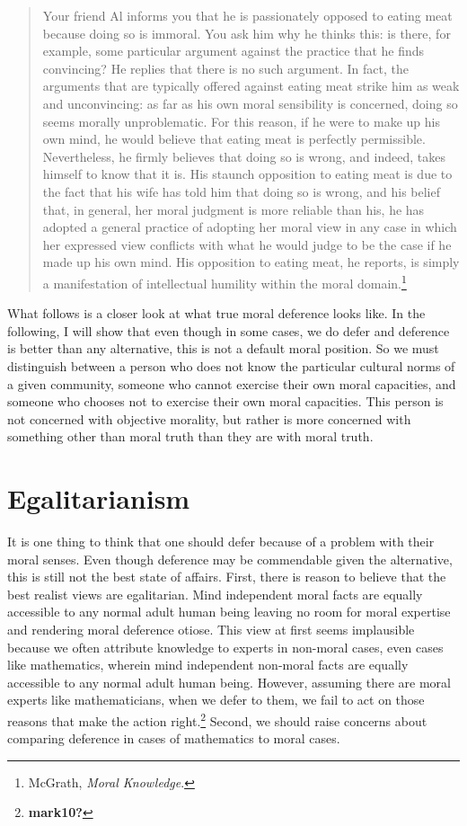 \documentclass[phdthesis,12pt,final]{wuthesis}
\theoremstyle{definition}
\theoremstyle{definition}
\theoremstyle{definition}
\theoremstyle{definition}
\theoremstyle{remark}
\begin{document}
\begin{quote}
Your friend Al informs you that he is passionately opposed to eating meat because doing so is immoral. You ask him why he thinks this: is there, for example, some particular argument against the practice that he finds convincing? He replies that there is no such argument. In fact, the arguments that are typically offered against eating meat strike him as weak and unconvincing: as far as his own moral sensibility is concerned, doing so seems morally unproblematic. For this reason, if he were to make up his own mind, he would believe that eating meat is perfectly permissible. Nevertheless, he firmly believes that doing so is wrong, and indeed, takes himself to know that it is. His staunch opposition to eating meat is due to the fact that his wife has told him that doing so is wrong, and his belief that, in general, her moral judgment is more reliable than his, he has adopted a general practice of adopting her moral view in any case in which her expressed view conflicts with what he would judge to be the case if he made up his own mind. His opposition to eating meat, he reports, is simply a manifestation of intellectual humility within the moral domain.\footnote{McGrath, \emph{Moral {Knowledge}}.}
\end{quote}

What follows is a closer look at what true moral deference looks like. In the following, I will show that even though in some cases, we do defer and deference is better than any alternative, this is not a default moral position. So we must distinguish between a person who does not know the particular cultural norms of a given community, someone who cannot exercise their own moral capacities, and someone who chooses not to exercise their own moral capacities. This person is not concerned with objective morality, but rather is more concerned with something other than moral truth than they are with moral truth.

\section{Egalitarianism}\label{egalitarianism}

It is one thing to think that one should defer because of a problem with their moral senses. Even though deference may be commendable given the alternative, this is still not the best state of affairs. First, there is reason to believe that the best realist views are egalitarian. Mind independent moral facts are equally accessible to any normal adult human being leaving no room for moral expertise and rendering moral deference otiose. This view at first seems implausible because we often attribute knowledge to experts in non-moral cases, even cases like mathematics, wherein mind independent non-moral facts are equally accessible to any normal adult human being. However, assuming there are moral experts like mathematicians, when we defer to them, we fail to act on those reasons that make the action right.\footnote{\textbf{mark10?}} Second, we should raise concerns about comparing deference in cases of mathematics to moral cases.
\end{document}

